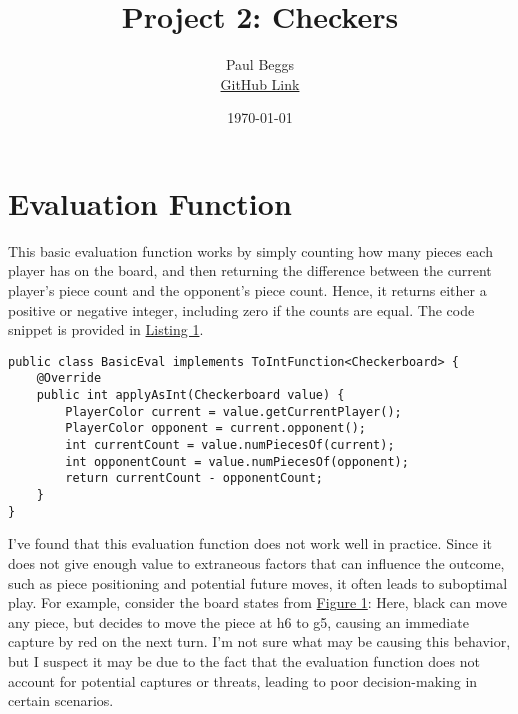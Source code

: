\documentclass[12pt]{article}
\title{Project 2: Checkers}
\author{Paul Beggs \\ \href{https://github.com/PaulBeggs/A_Star}{GitHub Link}}
\date{\today}
\begin{document}
\maketitle

\section{Evaluation Function}

This basic evaluation function works by simply counting how many pieces each player has on the board, and then returning the difference between the current player's piece count and the opponent's piece count. Hence, it returns either a positive or negative integer, including zero if the counts are equal. The code snippet is provided in \hyperref[list:basic_eval]{Listing 1}. \\

\label{list:basic_eval}
\begin{verbatim}
public class BasicEval implements ToIntFunction<Checkerboard> {
    @Override
    public int applyAsInt(Checkerboard value) {
        PlayerColor current = value.getCurrentPlayer();
        PlayerColor opponent = current.opponent();
        int currentCount = value.numPiecesOf(current);
        int opponentCount = value.numPiecesOf(opponent);
        return currentCount - opponentCount;
    }
}
\end{verbatim}
\vspace{2em}

I've found that this evaluation function does not work well in practice. Since it does not give enough value to extraneous factors that can influence the outcome, such as piece positioning and potential future moves, it often leads to suboptimal play. For example, consider the board states from \hyperref[fig:board_states]{Figure 1}: Here, black can move any piece, but decides to move the piece at h6 to g5, causing an immediate capture by red on the next turn. I'm not sure what may be causing this behavior, but I suspect it may be due to the fact that the evaluation function does not account for potential captures or threats, leading to poor decision-making in certain scenarios.
\end{document}
